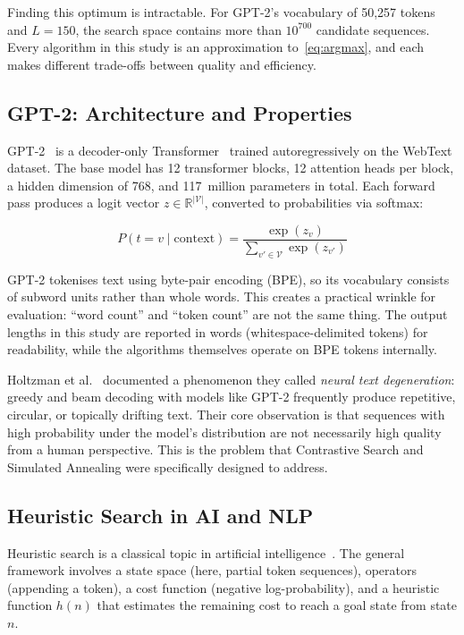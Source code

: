 \documentclass[12pt]{article}
\begin{document}
	Finding this optimum is intractable. For GPT-2's vocabulary of 50,257 tokens and $L=150$, the search space contains more than $10^{700}$ candidate sequences. Every algorithm in this study is an approximation to~\eqref{eq:argmax}, and each makes different trade-offs between quality and efficiency.
	
	\subsection{GPT-2: Architecture and Properties}
	
	GPT-2~\cite{radford2019gpt2} is a decoder-only Transformer~\cite{vaswani2017attention} trained autoregressively on the WebText dataset. The base model has 12 transformer blocks, 12 attention heads per block, a hidden dimension of 768, and 117~million parameters in total. Each forward pass produces a logit vector $z \in \mathbb{R}^{|\mathcal{V}|}$, converted to probabilities via softmax:
	
	\begin{equation}
		P(t = v \mid \text{context}) = \frac{\exp(z_v)}{\sum_{v' \in \mathcal{V}} \exp(z_{v'})}
		\label{eq:softmax}
	\end{equation}
	
	GPT-2 tokenises text using byte-pair encoding (BPE), so its vocabulary consists of subword units rather than whole words. This creates a practical wrinkle for evaluation: ``word count'' and ``token count'' are not the same thing. The output lengths in this study are reported in words (whitespace-delimited tokens) for readability, while the algorithms themselves operate on BPE tokens internally.
	
	Holtzman et al.~\cite{holtzman2020curious} documented a phenomenon they called \emph{neural text degeneration}: greedy and beam decoding with models like GPT-2 frequently produce repetitive, circular, or topically drifting text. Their core observation is that sequences with high probability under the model's distribution are not necessarily high quality from a human perspective. This is the problem that Contrastive Search and Simulated Annealing were specifically designed to address.
	
	\subsection{Heuristic Search in AI and NLP}
	
	Heuristic search is a classical topic in artificial intelligence~\cite{russellnorvig2020ai}. The general framework involves a state space (here, partial token sequences), operators (appending a token), a cost function (negative log-probability), and a heuristic function $h(n)$ that estimates the remaining cost to reach a goal state from state $n$.
	
\end{document}
